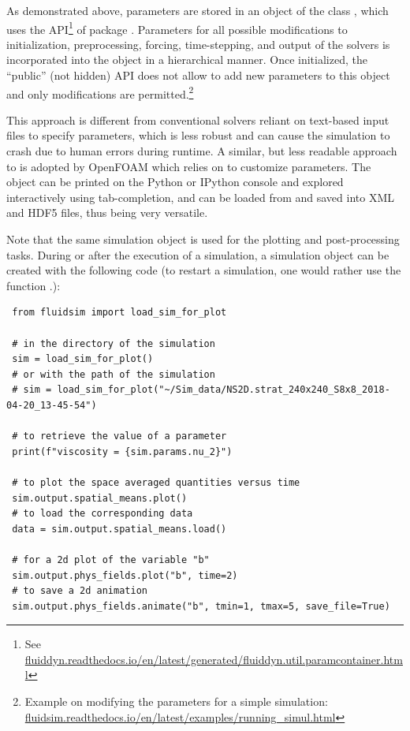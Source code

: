 As demonstrated above, parameters are stored in an object of the class
, which uses the
\href{https://fluiddyn.readthedocs.io/en/latest/generated/fluiddyn.util.paramcontainer.html}{}
API\footnote{See
\href{https://fluiddyn.readthedocs.io/en/latest/generated/fluiddyn.util.paramcontainer.html}{fluiddyn.readthedocs.io/en/latest/generated/fluiddyn.util.paramcontainer.html}}
of  package \cite{fluiddyn}.
%
Parameters for all possible modifications to initialization, preprocessing,
forcing, time-stepping, and output of the solvers is incorporated into the
object  in a hierarchical manner.
%
Once initialized, the ``public'' (not hidden) API does not allow to add new
parameters to this object and only modifications are permitted.\footnote{Example
on modifying the parameters for a simple simulation:
\href{https://fluidsim.readthedocs.io/en/latest/examples/running-simul-onlineplot.html}{%
fluidsim.readthedocs.io/en/latest/examples/running\_simul.html}}


This approach is different from conventional solvers reliant on
text-based input files to specify parameters, which is less robust and can
cause the simulation to crash due to human errors during runtime.
%
A similar, but less readable approach to  is
adopted by OpenFOAM which relies on  to customize
parameters.  The  object can be printed on the Python or
IPython console and explored interactively using tab-completion, and can be
loaded from and saved into XML and HDF5 files, thus being very versatile.

Note that the same simulation object is used for the plotting and post-processing
tasks.  During or after the execution of a simulation, a simulation object can be
created with the following code (to restart a simulation, one would rather use the
function .):
\begin{verbatim}
 from fluidsim import load_sim_for_plot

 # in the directory of the simulation
 sim = load_sim_for_plot()
 # or with the path of the simulation
 # sim = load_sim_for_plot("~/Sim_data/NS2D.strat_240x240_S8x8_2018-04-20_13-45-54")

 # to retrieve the value of a parameter
 print(f"viscosity = {sim.params.nu_2}")

 # to plot the space averaged quantities versus time
 sim.output.spatial_means.plot()
 # to load the corresponding data
 data = sim.output.spatial_means.load()

 # for a 2d plot of the variable "b"
 sim.output.phys_fields.plot("b", time=2)
 # to save a 2d animation
 sim.output.phys_fields.animate("b", tmin=1, tmax=5, save_file=True)
\end{verbatim}

